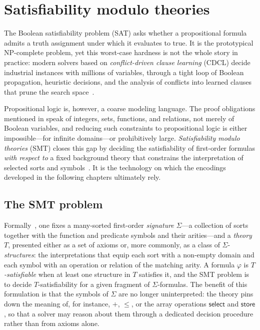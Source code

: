\section{Satisfiability modulo theories}
\label{sec:ar-smt}

The Boolean satisfiability problem (SAT) asks whether a propositional formula
admits a truth assignment under which it evaluates to true.
It is the prototypical NP-complete problem, yet this worst-case hardness is not
the whole story in practice: modern solvers based on \emph{conflict-driven
clause learning} (CDCL) decide industrial instances with millions of variables,
through a tight loop of Boolean propagation, heuristic decisions, and the
analysis of conflicts into learned clauses that prune the search
space~\cite{biere2021handbook}.

Propositional logic is, however, a coarse modeling language.
The proof obligations mentioned in  speak of integers, sets,
functions, and relations, not merely of Boolean variables,
and reducing such constraints to propositional logic is either impossible---for
infinite domains---or prohibitively large.
\emph{Satisfiability modulo theories} (SMT) closes this gap by deciding the
satisfiability of first-order formulas \emph{with respect to} a fixed background
theory that constrains the interpretation of selected sorts and
symbols~\cite{barrett2021smt}.
It is the technology on which the encodings developed in the following chapters
ultimately rely.

\subsection{The SMT problem}
\label{subsec:smt-problem}

Formally~\cite{barrett2021smt}, one fixes a many-sorted first-order
\emph{signature} \(\Sigma\)---a collection of sorts together with the function
and predicate symbols and their arities---and a \emph{theory} \(T\), presented
either as a set of axioms or, more commonly, as a class of
\(\Sigma\)-\emph{structures}: the interpretations that equip each sort with a
non-empty domain and each symbol with an operation or relation of the matching
arity.
A formula \(\varphi\) is \emph{\(T\)-satisfiable} when at least one structure in
\(T\) satisfies it, and the SMT problem is to decide \(T\)-satisfiability for a
given fragment of \(\Sigma\)-formulas.
The benefit of this formulation is that the symbols of \(\Sigma\) are no longer
uninterpreted: the theory pins down the meaning of, for instance, \(+\),
\(\le\), or the array operations \(\mathsf{select}\) and \(\mathsf{store}\), so
that a solver may reason about them through a dedicated decision procedure rather
than from axioms alone.

